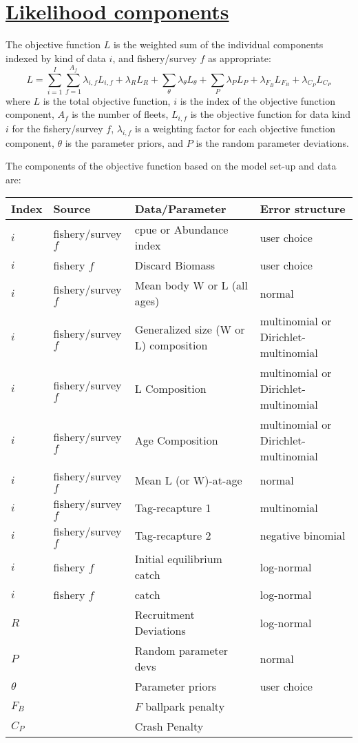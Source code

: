 \hypertarget{LikeComp}{}
\section[Likelihood components]{\protect\hyperlink{LikeComp}{Likelihood components}}

The objective function $L$ is the weighted sum of the individual components
indexed by kind of data $i$, and fishery/survey $f$ as appropriate:
\begin{equation}
	L = \sum_{i=1}^{I}\sum_{f=1}^{A_f}\lambda_{i,f} L_{i,f}+\lambda_R L_R + 
	  \sum_{\theta}^{}\lambda_\theta L_\theta + \sum_{P}^{}\lambda_P L_P +
	  \lambda_{F_B} L_{F_B} + \lambda_{C_P} L_{C_P}
\end{equation}
where $L$ is the total objective function, $i$ is the index of the objective
function component, $A_f$ is the number of fleets, $L_{i,f}$ is the
objective function for data kind $i$ for the fishery/survey $f$,
$\lambda_{i,f}$ is a weighting factor for each objective function component,
$\theta$ is the parameter priors, and $P$ is the random parameter deviations.

The components of the objective function based on the model set-up and data are: 
\begin{longtable}{p{1cm} p{2.75cm} p{4.75cm} p{6.5cm}}
	\hline
	Index & Source & Data/Parameter & Error structure \Tstrut\Bstrut\\
	\hline	
	$i$ & fishery/survey $f$ & \gls{cpue} or Abundance index & user choice \Tstrut\\
	$i$ & fishery $f$ & Discard Biomass & user choice \Tstrut\\
	$i$ & fishery/survey $f$ & Mean body W or L (all ages) & normal \Tstrut\\
	$i$ & fishery/survey $f$ & Generalized size (W or L) composition & multinomial or Dirichlet-multinomial \Tstrut\\
	$i$ & fishery/survey $f$ & L Composition & multinomial or Dirichlet-multinomial \Tstrut\\
	$i$ & fishery/survey $f$ & Age Composition & multinomial or Dirichlet-multinomial \Tstrut\\
	$i$ & fishery/survey $f$ & Mean L (or W)-at-age & normal \Tstrut\\
	$i$ & fishery/survey $f$ & Tag-recapture 1 & multinomial \Tstrut\\
	$i$ & fishery/survey $f$ & Tag-recapture 2 & negative binomial \Tstrut\\
	$i$ & fishery $f$ & Initial equilibrium catch & log-normal \Tstrut\\
	$i$ & fishery $f$ & catch & log-normal \Tstrut\\
	$R$ & & Recruitment Deviations & log-normal \Tstrut\\
	$P$ & & Random parameter devs & normal \Tstrut\\
	$\theta$ & & Parameter priors & user choice \Tstrut\\
	$F_B$ & & $F$ ballpark penalty & \Tstrut\\
	$C_P$ &	& Crash Penalty	& \Tstrut\Bstrut\\
	\hline
\end{longtable}

